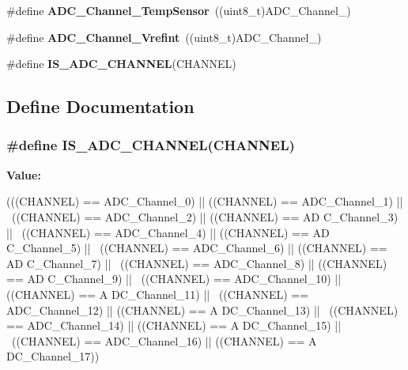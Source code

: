 \begin{DoxyCompactItemize}
\item 
\hypertarget{group__ADC__channels_ga1efc096b8d4a8d15c4a7d91f5c03c6c7}{
\#define {\bfseries ADC\_\-Channel\_\-TempSensor}~((uint8\_\-t)ADC\_\-Channel\_)}
\label{group__ADC__channels_ga1efc096b8d4a8d15c4a7d91f5c03c6c7}

\item 
\hypertarget{group__ADC__channels_ga5d48ded5138e6f1efe3a7634eff4d125}{
\#define {\bfseries ADC\_\-Channel\_\-Vrefint}~((uint8\_\-t)ADC\_\-Channel\_)}
\label{group__ADC__channels_ga5d48ded5138e6f1efe3a7634eff4d125}

\item 
\#define {\bfseries IS\_\-ADC\_\-CHANNEL}(CHANNEL)
\end{DoxyCompactItemize}


\subsection{Define Documentation}
\hypertarget{group__ADC__channels_gaba41910dcb2b449c613a5ef638862e77}{
\subsubsection[{IS\_\-ADC\_\-CHANNEL}]{\setlength{\rightskip}{0pt plus 5cm}\#define IS\_\-ADC\_\-CHANNEL(CHANNEL)}}
\label{group__ADC__channels_gaba41910dcb2b449c613a5ef638862e77}
{\bfseries Value:}
\begin{DoxyCode}
(((CHANNEL) == ADC_Channel_0) || ((CHANNEL) == ADC_Channel_1) || \
                                 ((CHANNEL) == ADC_Channel_2) || ((CHANNEL) == AD
      C_Channel_3) || \
                                 ((CHANNEL) == ADC_Channel_4) || ((CHANNEL) == AD
      C_Channel_5) || \
                                 ((CHANNEL) == ADC_Channel_6) || ((CHANNEL) == AD
      C_Channel_7) || \
                                 ((CHANNEL) == ADC_Channel_8) || ((CHANNEL) == AD
      C_Channel_9) || \
                                 ((CHANNEL) == ADC_Channel_10) || ((CHANNEL) == A
      DC_Channel_11) || \
                                 ((CHANNEL) == ADC_Channel_12) || ((CHANNEL) == A
      DC_Channel_13) || \
                                 ((CHANNEL) == ADC_Channel_14) || ((CHANNEL) == A
      DC_Channel_15) || \
                                 ((CHANNEL) == ADC_Channel_16) || ((CHANNEL) == A
      DC_Channel_17))
\end{DoxyCode}
